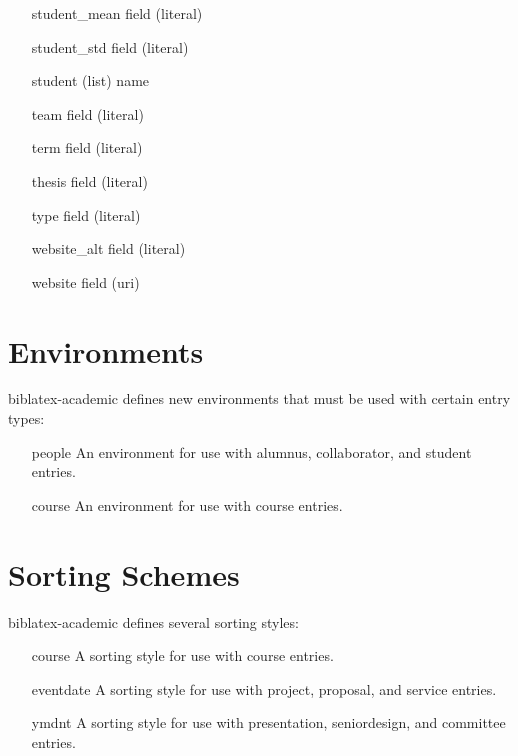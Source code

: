 \documentclass[11pt,letterpaper]{article}
\newcommand{\pkg}[1]{\textsf{#1}}
\newcommand{\entry}[1]{\textsf{#1}}
\newcommand{\field}[1]{\textsf{#1}}
\newcommand{\env}[1]{\textsf{#1}}
\newcommand{\sort}[1]{\textsf{#1}}
\begin{document}
\begin{itemize}
    \item[\field{student\_mean}] field (literal)
    \item[\field{student\_std}] field (literal)
    \item[\field{student}] (list) name
    \item[\field{team}] field (literal)
    \item[\field{term}] field (literal)
    \item[\field{thesis}] field (literal)
    \item[\field{type}] field (literal)
    \item[\field{website\_alt}] field (literal)
    \item[\field{website}] field (uri)
\end{itemize}


\section{Environments}\label{sec:environments}

\pkg{biblatex-academic} defines new environments that must be used with certain entry types:

\begin{itemize}
  \item[\env{people}] An environment for use with \entry{alumnus}, \entry{collaborator}, and \entry{student} entries.
  \item[\env{course}] An environment for use with \entry{course} entries.
\end{itemize}


\section{Sorting Schemes}\label{sec:sorting}

\pkg{biblatex-academic} defines several sorting styles:

\begin{itemize}
  \item[\sort{course}] A sorting style for use with \entry{course} entries.
  \item[\sort{eventdate}] A sorting style for use with \entry{project}, \entry{proposal}, and \entry{service} entries.
  \item[\sort{ymdnt}] A sorting style for use with \entry{presentation}, \entry{seniordesign}, and \entry{committee} entries.
\end{itemize}
\end{document}
